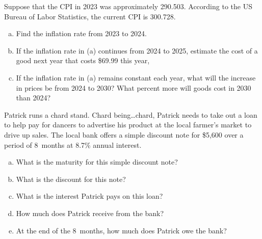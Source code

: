 \documentclass[11pt,letterpaper]{article}
\begin{document}

 Suppose that the CPI in 2023 was approximately 290.503. According to the US Bureau of Labor Statistics, the current CPI is 300.728.
	\begin{enumerate}[(a)]
	\item Find the inflation rate from 2023 to 2024. 
	\item If the inflation rate in (a) continues from 2024 to 2025, estimate the cost of a good next year that costs \$69.99 this year,
	\item If the inflation rate in (a) remains constant each year, what will the increase in prices be from 2024 to 2030? What percent more will goods cost in 2030 than 2024?
	\end{enumerate}



\newpage



 Patrick runs a chard stand. Chard being\dots chard, Patrick needs to take out a loan to help pay for dancers to advertise his product at the local farmer's market to drive up sales. The local bank offers a simple discount note for \$5,600 over a period of 8~months at 8.7\% annual interest. 
	\begin{enumerate}[(a)]
	\item What is the maturity for this simple discount note?
	\item What is the discount for this note?
	\item What is the interest Patrick pays on this loan?
	\item How much does Patrick receive from the bank?
	\item At the end of the 8~months, how much does Patrick owe the bank?
	\end{enumerate}
\end{document}
